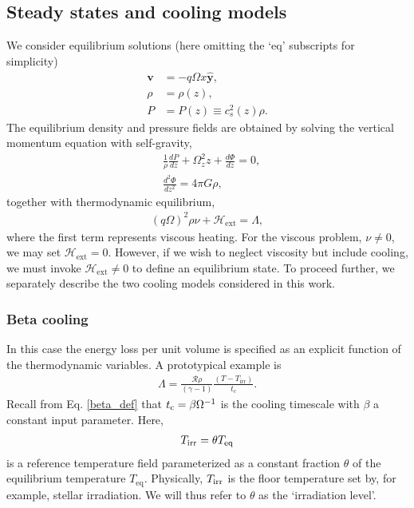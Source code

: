 
\subsection{Steady states and cooling models}
We consider equilibrium solutions (here omitting the `eq' subscripts
for simplicity)  
\begin{align}
  \bm{v} &= -q\Omega x \hat{\bm{y}}, \\
  \rho   &= \rho(z),\\
  P      &= P(z) \equiv c_s^2(z)\rho.
\end{align} 
The equilibrium density and pressure fields are obtained by solving
the vertical momentum equation with self-gravity,
\begin{align}
  &\frac{1}{\rho}\frac{dP}{dz} +
  \Omega_z^2z + \frac{d\Phi}{dz} = 0, \label{vert_eq1}\\
 &\frac{d^2\Phi}{dz^2} = 4 \pi G \rho,\label{vert_eq2}
\end{align}
together with thermodynamic equilibrium,
\begin{align}\label{thermal_eq}
(q\Omega)^2\rho\nu + \mathcal{H}_\mathrm{ext} = \Lambda,
\end{align}
where the first term represents viscous heating. For the viscous
problem, $\nu\neq0$, we may set $\mathcal{H}_\mathrm{ext}=0$. However,
if we wish to neglect viscosity but include cooling, we must invoke
$\mathcal{H}_\mathrm{ext}\neq0$ to define an equilibrium state.  
To proceed further, we separately describe the two cooling models
considered in this work. 

\subsubsection{Beta cooling}
In this case the energy loss per unit volume is specified 
as an explicit function of the thermodynamic variables. 
A prototypical example is 
\begin{align}\label{beta_cool}
  \Lambda =
  \frac{\mathcal{R}\rho}{(\gamma-1)}\frac{\left(T-T_\mathrm{irr}\right)}{t_c}. 
\end{align}
Recall from Eq. \ref{beta_def} that 
  $t_\mathrm{c} = \beta\Omega^{-1}$ is 
the cooling timescale with $\beta$ a constant input parameter. Here, 
\begin{align}
  T_\mathrm{irr} = \theta T_\mathrm{eq}
\end{align}
is a reference temperature field parameterized as a constant 
fraction $\theta$ of the equilibrium temperature
$T_\mathrm{eq}$. Physically, $T_\mathrm{irr}$ is the floor temperature set by,
for example, stellar irradiation. We will thus refer to $\theta$ as
the `irradiation level'. %

